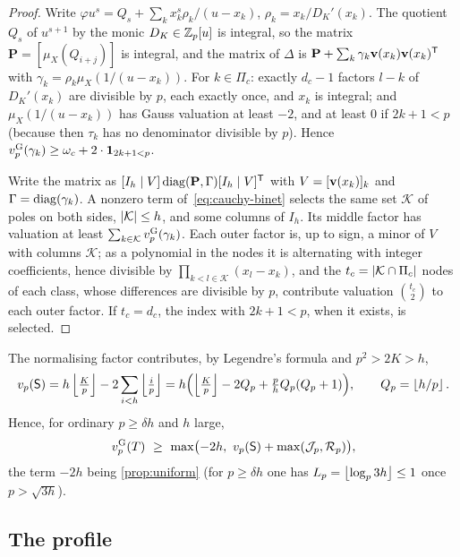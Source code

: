 \begin{proof}
Write $\varphi u^s=Q_s+\sum_kx_k^s\rho_k/(u-x_k)$, $\rho_k=x_k/D_K'(x_k)$. The quotient
$Q_s$ of $u^{s+1}$ by the monic $D_K\in\mathbb{Z}_p[u]$ is integral, so the matrix $\mathbf P=
[\mu_X(Q_{i+j})]$ is integral, and the matrix of $\Delta$ is
$\mathbf P+\sum_k\gamma_k\mathbf{v}(x_k)\mathbf{v}(x_k)^{\mathsf T}$ with
$\gamma_k=\rho_k\mu_X(1/(u-x_k))$. For $k\in\Pi_c$: exactly $d_c-1$
factors $l-k$ of $D_K'(x_k)$ are divisible by $p$, each exactly once, and $x_k$ is integral; and
$\mu_X(1/(u-x_k))$ has Gauss valuation at least $-2$, and at least $0$ if $2k+1<p$ (because then
$\tau_k$ has no denominator divisible by $p$). Hence $v_{p}^{\mathrm{G}}(\gamma_k)\ge\omega_c+2\cdot\mathbf{1}_{2k+1<p}$.

Write the matrix as $[I_h\mid V]\operatorname{diag}(\mathbf P,\Gamma)[I_h\mid V]^{\mathsf T}$ with
$V=[\mathbf{v}(x_k)]_k$ and $\Gamma=\operatorname{diag}(\gamma_k)$. A nonzero term of~\eqref{eq:cauchy-binet}
selects the same set $\mathcal K$ of poles on both sides, $\left\lvert \mathcal K\right\rvert\le h$, and some columns of
$I_h$. Its middle factor has valuation at least $\sum_{k\in\mathcal K}v_{p}^{\mathrm{G}}(\gamma_k)$. Each outer
factor is, up to sign, a minor of $V$ with columns $\mathcal K$; as a polynomial in the nodes it is
alternating with integer coefficients, hence divisible by $\prod_{k<l\in\mathcal K}(x_l-x_k)$, and
the $t_c=\left\lvert \mathcal K\cap\Pi_c\right\rvert$ nodes of each class, whose differences are divisible by $p$, contribute
valuation $\binom{t_c}{2}$ to each outer factor. If
$t_c=d_c$, the index with $2k+1<p$, when it exists, is selected.
\end{proof}

The normalising factor contributes, by Legendre's formula and $p^2>2K>h$,
\begin{equation}\label{eq:vp-S}
  v_p(\mathsf{S})=h\left\lfloor \tfrac Kp\right\rfloor-2\sum_{i<h}\left\lfloor \tfrac ip\right\rfloor
  =h\Bigl(\left\lfloor \tfrac Kp\right\rfloor-2Q_p+\tfrac phQ_p(Q_p+1)\Bigr),\qquad Q_p=\left\lfloor h/p\right\rfloor.
\end{equation}
Hence, for ordinary $p\ge\delta h$ and $h$ large,
\begin{equation}\label{eq:vp-T-combined}
  v_{p}^{\mathrm{G}}(T)\ \ge\ \max\bigl(-2h,\ v_p(\mathsf{S})+\max(\mathcal J_p,\mathcal R_p)\bigr),
\end{equation}
the term $-2h$ being \cref{prop:uniform} (for $p\ge\delta h$ one has $L_p=\left\lfloor \log_p3h\right\rfloor\le1$ once
$p>\sqrt{3h}$).

\subsection{The profile}\label{subsec:profile}

